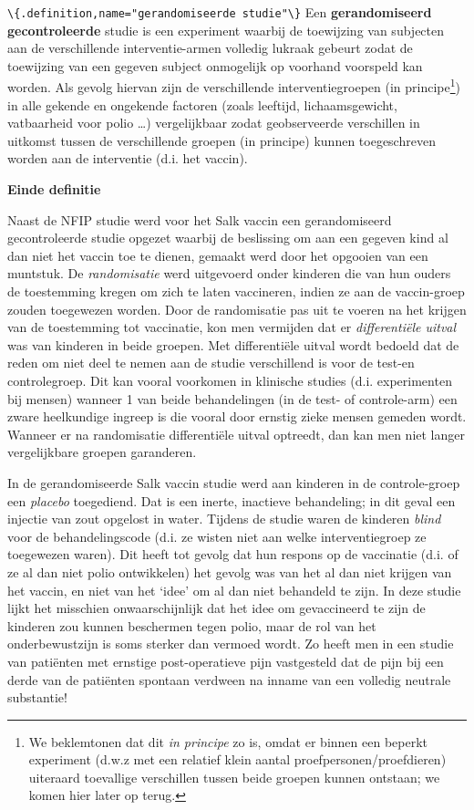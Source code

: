 \documentclass[
  12pt,dutch,coursenotes]{book}
\newcommand{\passthrough}[1]{#1}
\begin{document}
\passthrough{\lstinline!\{.definition,name="gerandomiseerde studie"\}!}
Een \textbf{gerandomiseerd gecontroleerde} studie is een experiment waarbij
de toewijzing van subjecten aan de verschillende interventie-armen volledig
lukraak gebeurt zodat de toewijzing van een gegeven subject onmogelijk op
voorhand voorspeld kan worden. Als gevolg hiervan zijn de verschillende
interventiegroepen (in principe\footnote{We beklemtonen dat dit \emph{in principe} zo is, omdat er binnen een beperkt experiment (d.w.z met een relatief klein aantal proefpersonen/proefdieren) uiteraard toevallige verschillen tussen beide groepen kunnen ontstaan; we komen hier later op terug.}) in alle gekende en ongekende factoren (zoals
leeftijd, lichaamsgewicht, vatbaarheid voor polio \ldots) vergelijkbaar zodat
geobserveerde verschillen in uitkomst tussen de verschillende groepen (in
principe) kunnen toegeschreven worden aan de interventie (d.i. het vaccin).

\textbf{Einde definitie}

Naast de NFIP studie werd voor het Salk vaccin een gerandomiseerd
gecontroleerde studie opgezet waarbij de beslissing om aan een gegeven kind
al dan niet het vaccin toe te dienen, gemaakt werd door het opgooien van een
muntstuk. De \emph{randomisatie} werd uitgevoerd onder kinderen die van
hun ouders de toestemming kregen om zich te laten vaccineren, indien ze aan de
vaccin-groep zouden toegewezen worden. Door de randomisatie pas uit te
voeren na het krijgen van de toestemming tot vaccinatie, kon men vermijden
dat er \emph{differentiële uitval} was van kinderen in beide
groepen. Met differentiële uitval wordt bedoeld dat de reden om niet
deel te nemen aan de studie verschillend is voor de test-en controlegroep.
Dit kan vooral voorkomen in klinische studies (d.i. experimenten bij mensen)
wanneer 1 van beide behandelingen (in de test- of
controle-arm) een zware heelkundige ingreep is die vooral door ernstig zieke
mensen gemeden wordt. Wanneer er na randomisatie differentiële uitval
optreedt, dan kan men niet langer vergelijkbare groepen garanderen.

In de gerandomiseerde Salk vaccin studie werd aan kinderen in de
controle-groep een \emph{placebo} toegediend. Dat is een inerte, inactieve
behandeling; in dit geval een injectie van zout opgelost in water. Tijdens
de studie waren de kinderen \emph{blind} voor de behandelingscode (d.i. ze
wisten niet aan welke interventiegroep ze toegewezen waren). Dit heeft tot
gevolg dat hun respons op de vaccinatie (d.i. of ze al dan niet polio
ontwikkelen) het gevolg was van het al dan niet krijgen van het vaccin, en
niet van het `idee' om al dan niet behandeld te zijn. In deze studie lijkt het misschien onwaarschijnlijk dat het idee
om gevaccineerd te zijn de kinderen zou kunnen beschermen tegen polio, maar
de rol van het onderbewustzijn is soms sterker dan vermoed wordt. Zo heeft
men in een studie van patiënten met ernstige post-operatieve pijn
vastgesteld dat de pijn bij een derde van de patiënten spontaan verdween
na inname van een volledig neutrale substantie!
\end{document}
